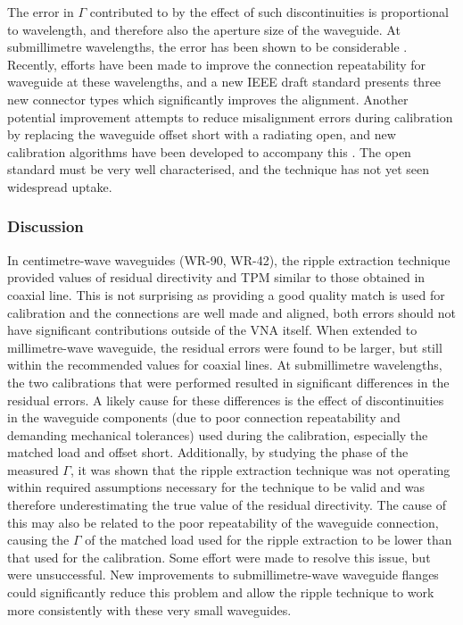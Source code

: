 \documentclass[../thesis/thesis.tex]{subfiles}
\begin{document}
\begin{refsection}
The error in $\Gamma$ contributed to by the effect of such discontinuities is proportional to wavelength, and therefore also the aperture size of the waveguide. At submillimetre wavelengths, the error has been shown to be considerable \cite{Williams_2011, Li_2012}. Recently, efforts have been made to improve the connection repeatability for waveguide at these wavelengths, and a new IEEE draft standard \cite{IEEE1785} presents three new connector types which significantly improves the alignment. Another potential improvement attempts to reduce misalignment errors during calibration by replacing the waveguide offset short with a radiating open, and new calibration algorithms have been developed to accompany this \cite{Arsenovic_2014}. The open standard must be very well characterised, and the technique has not yet seen widespread uptake.

\subsubsection{Discussion}

In centimetre-wave waveguides (WR-90, WR-42), the ripple extraction technique provided values of residual directivity and TPM similar to those obtained in coaxial line. This is not surprising as providing a good quality match is used for calibration and the connections are well made and aligned, both errors should not have significant contributions outside of the VNA itself. When extended to millimetre-wave waveguide, the residual errors were found to be larger, but still within the recommended values for coaxial lines. At submillimetre wavelengths, the two calibrations that were performed resulted in significant differences in the residual errors. A likely cause for these differences is the effect of discontinuities in the waveguide components (due to poor connection repeatability and demanding mechanical tolerances) used during the calibration, especially the matched load and offset short. Additionally, by studying the phase of the measured $\Gamma$, it was shown that the ripple extraction technique was not operating within required assumptions necessary for the technique to be valid and was therefore underestimating the true value of the residual directivity. The cause of this may also be related to the poor repeatability of the waveguide connection, causing the $\Gamma$ of the matched load used for the ripple extraction to be lower than that used for the calibration. Some effort were made to resolve this issue, but were unsuccessful. New improvements to submillimetre-wave waveguide flanges could significantly reduce this problem and allow the ripple technique to work more consistently with these very small waveguides.


\end{refsection}
\end{document}

